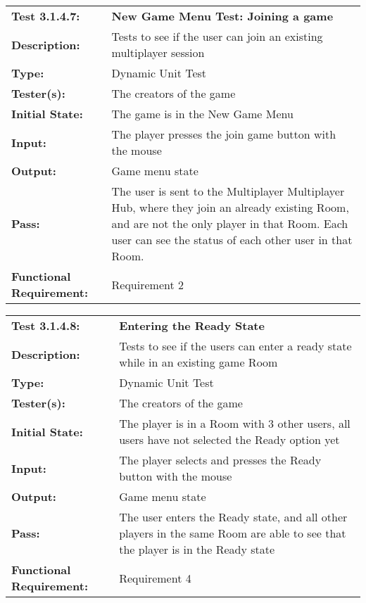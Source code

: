 \documentclass[12pt, titlepage]{article}
\begin{document}
\begin{mdframed}[linewidth=1pt]
\begin{tabularx}{\textwidth}{@{}p{3cm}X@{}}
{\bf Test 3.1.4.7:} & {\bf New Game Menu Test: Joining a game}\\[\baselineskip]
{\bf Description:} & Tests to see if the user can join an existing multiplayer session\\[0.5\baselineskip]
{\bf Type:} & Dynamic Unit Test\\[0.5\baselineskip]
{\bf Tester(s):} & The creators of the game\\[0.5\baselineskip]
{\bf Initial State:} & The game is in the New Game Menu\\[0.5\baselineskip]
{\bf Input:} & The player presses the join game button with the mouse \\[0.5\baselineskip]
{\bf Output:} & Game menu state\\[0.5\baselineskip]
{\bf Pass:} & The user is sent to the Multiplayer Multiplayer Hub, where they join an already existing Room, and are not the only player in that Room. Each user can see the status of each other user in that Room. \\[0.5\baselineskip]
{\bf Functional Requirement:} & Requirement 2
\end{tabularx}
\end{mdframed}

\begin{mdframed}[linewidth=1pt]
\begin{tabularx}{\textwidth}{@{}p{3cm}X@{}}
{\bf Test 3.1.4.8:} & {\bf Entering the Ready State}\\[\baselineskip]
{\bf Description:} & Tests to see if the users can enter a ready state while in an existing game Room\\[0.5\baselineskip]
{\bf Type:} & Dynamic Unit Test\\[0.5\baselineskip]
{\bf Tester(s):} & The creators of the game\\[0.5\baselineskip]
{\bf Initial State:} & The player is in a Room with 3 other users, all users have not selected the Ready option yet\\[0.5\baselineskip]
{\bf Input:} & The player selects and presses the Ready button with the mouse \\[0.5\baselineskip]
{\bf Output:} & Game menu state\\[0.5\baselineskip]
{\bf Pass:} & The user enters the Ready state, and all other players in the same Room are able to see that the player is in the Ready state \\[0.5\baselineskip]
{\bf Functional Requirement:} & Requirement 4
\end{tabularx}
\end{mdframed}
\end{document}
